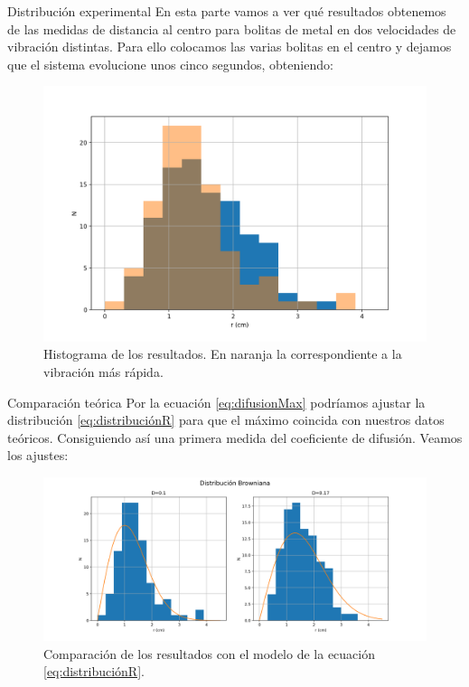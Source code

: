 \documentclass{beamer}
\begin{document}
\begin{frame}{Distribución experimental}
En esta parte vamos a ver qué resultados obtenemos de las medidas de distancia al centro para bolitas de metal en dos velocidades de vibración distintas. Para ello colocamos las varias bolitas en el centro y dejamos que el sistema evolucione unos cinco segundos, obteniendo:

\begin{figure}[h!]
\begin{center}
\includegraphics[scale=0.3]{Histograma resultados.png}
\caption{Histograma de los resultados. En naranja la correspondiente a la vibración más rápida.}
\end{center}
\end{figure}
\end{frame}

\begin{frame}{Comparación teórica}
Por la ecuación \ref{eq:difusionMax} podríamos ajustar la distribución \ref{eq:distribuciónR} para que el máximo coincida con nuestros datos teóricos. Consiguiendo así una primera medida del coeficiente de difusión. Veamos los ajustes:

\begin{figure}[h!]
\begin{center}
\includegraphics[scale=0.32]{Comparacion.png}
\caption{Comparación de los resultados con el modelo de la ecuación \ref{eq:distribuciónR}.}
\end{center}
\end{figure}
\end{frame}
\end{document}
